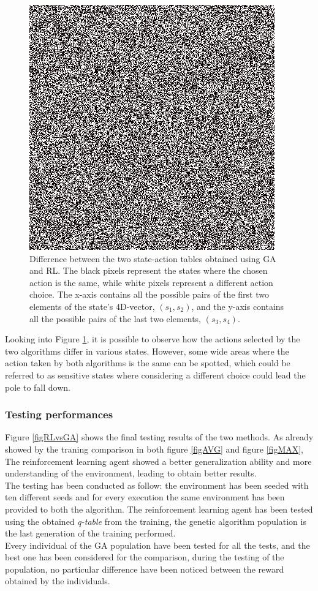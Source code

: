 \begin{figure}[H]
	\centering
	\includegraphics [scale = 0.7]{Images/diff.png}
	\caption{Difference between the two state-action tables obtained using GA and RL. The black pixels represent the states where the chosen action is the same, while white pixels represent a different action choice. The x-axis contains all the possible pairs of the first two elements of the state's 4D-vector, $(s_1,s_2)$, and the y-axis contains all the possible pairs of the last two elements, $(s_3,s_4)$. }
	\label{figTABLEDIFF}
\end{figure}

Looking into Figure \ref{figTABLEDIFF}, it is possible to observe how the actions selected by the two algorithms differ in various states. However, some wide areas where the action taken by both algorithms is the same can be spotted, which could be referred to as sensitive states where considering a different choice could lead the pole to fall down.\\

\subsubsection{Testing performances}

Figure \ref{figRLvsGA} shows the final testing results of the two methods. As already showed by the traning comparison in both figure \ref{figAVG} and figure \ref{figMAX}, The reinforcement learning agent showed a better generalization ability and more understanding of the environment, leading to obtain better results.\\
The testing has been conducted as follow: the environment has been seeded with ten different seeds and for every execution the same environment has been provided to both the algorithm.
The reinforcement learning agent has been tested using the obtained \textit{q-table} from the training, the genetic algorithm population is the last generation of the training performed.\\
Every individual of the GA population have been tested for all the tests, and the best one has been considered for the comparison, during the testing of the population, no particular difference have been noticed between the reward obtained by the individuals.

